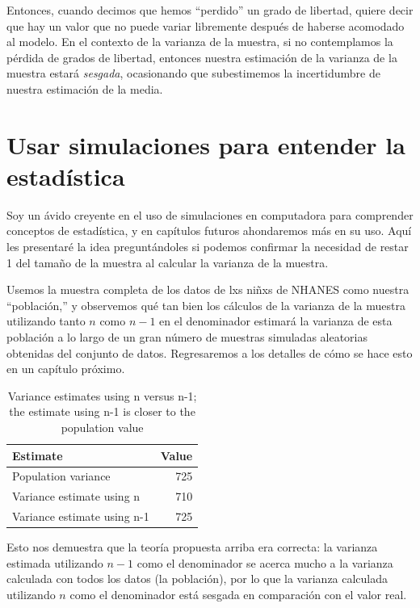 \documentclass[
  12pt,
]{book}
\theoremstyle{definition}
\theoremstyle{definition}
\theoremstyle{definition}
\theoremstyle{remark}
\begin{document}
Entonces, cuando decimos que hemos ``perdido'' un grado de libertad, quiere decir que hay un valor que no puede variar libremente después de haberse acomodado al modelo. En el contexto de la varianza de la muestra, si no contemplamos la pérdida de grados de libertad, entonces nuestra estimación de la varianza de la muestra estará \emph{sesgada}, ocasionando que subestimemos la incertidumbre de nuestra estimación de la media.

\hypertarget{usar-simulaciones-para-entender-la-estaduxedstica}{%
\section{Usar simulaciones para entender la estadística}\label{usar-simulaciones-para-entender-la-estaduxedstica}}

Soy un ávido creyente en el uso de simulaciones en computadora para comprender conceptos de estadística, y en capítulos futuros ahondaremos más en su uso. Aquí les presentaré la idea preguntándoles si podemos confirmar la necesidad de restar 1 del tamaño de la muestra al calcular la varianza de la muestra.

Usemos la muestra completa de los datos de lxs niñxs de NHANES como nuestra ``población,'' y observemos qué tan bien los cálculos de la varianza de la muestra utilizando tanto \(n\) como \(n-1\) en el denominador estimará la varianza de esta población a lo largo de un gran número de muestras simuladas aleatorias obtenidas del conjunto de datos. Regresaremos a los detalles de cómo se hace esto en un capítulo próximo.

\begin{table}

\caption{\label{tab:unnamed-chunk-22}Variance estimates using n versus n-1; the estimate using n-1 is closer to the population value}
\centering
\begin{tabular}[t]{l|r}
\hline
Estimate & Value\\
\hline
Population variance & 725\\
\hline
Variance estimate using n & 710\\
\hline
Variance estimate using n-1 & 725\\
\hline
\end{tabular}
\end{table}

Esto nos demuestra que la teoría propuesta arriba era correcta: la varianza estimada utilizando \(n - 1\) como el denominador se acerca mucho a la varianza calculada con todos los datos (la población), por lo que la varianza calculada utilizando \(n\) como el denominador está sesgada en comparación con el valor real.
\end{document}
